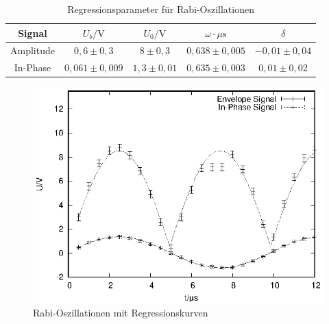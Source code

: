 \begin{table}[h]
  \centering
  \begin{tabular}{c c c c c}
    \toprule
    Signal & $U_b/\mathrm{V}$ & $U_0/\mathrm{V}$ & $\omega \cdot \mu\mathrm{s}$ & $\delta$ \\
    \midrule
    Amplitude & $0,6 \pm 0,3$ & $8 \pm 0,3$ & $0,638 \pm 0,005$ & $-0,01 \pm 0,04$ \\
    In-Phase & $0,061 \pm 0,009$ & $1,3 \pm 0,01$& $0,635 \pm 0,003$ & $0,01 \pm 0,02$ \\
    \bottomrule
  \end{tabular}
  \caption{Regressionsparameter für Rabi-Oszillationen}
  \label{tab:rabi}
\end{table}

\begin{figure}[h]
  \centering
  \includegraphics[width=0.75 \linewidth]{data/p402_443_data/rabi_f_1/rabi_1.eps}
  \caption{Rabi-Oszillationen mit Regressionskurven}
  \label{fig:rabi}
\end{figure}

\newpage
